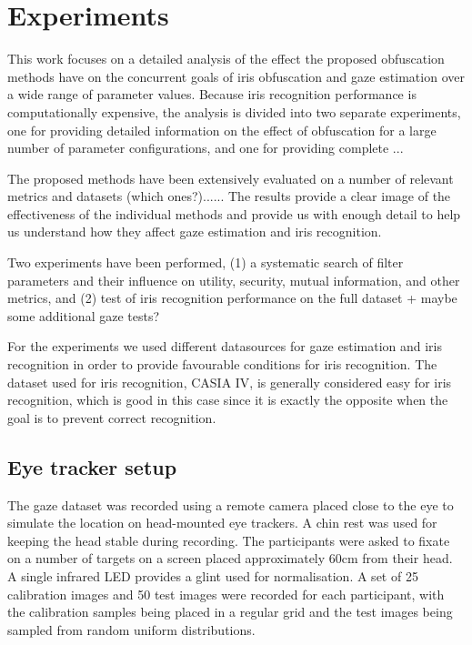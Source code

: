 \section{Experiments}
This work focuses on a detailed analysis of the effect the proposed obfuscation methods have on the concurrent goals of iris obfuscation and gaze estimation over a wide range of parameter values. Because iris recognition performance is computationally expensive, the analysis is divided into two separate experiments, one for providing detailed information on the effect of obfuscation for a large number of parameter configurations, and one for providing complete ...



The proposed methods have been extensively evaluated on a number of relevant metrics and datasets (which ones?)...... The results provide a clear image of the effectiveness of the individual methods and provide us with enough detail to help us understand how they affect gaze estimation and iris recognition.

Two experiments have been performed, (1) a systematic search of filter parameters and their influence on utility, security, mutual information, and other metrics, and (2) test of iris recognition performance on the full dataset + maybe some additional gaze tests?


For the experiments we used different datasources for gaze estimation and iris recognition in order to provide favourable conditions for iris recognition. The dataset used for iris recognition, CASIA IV, is generally considered easy for iris recognition, which is good in this case since it is exactly the opposite when the goal is to prevent correct recognition.


\subsection{Eye tracker setup}



The gaze dataset was recorded using a remote camera placed close to the eye to simulate the location on head-mounted eye trackers. A chin rest was used for keeping the head stable during recording. The participants were asked to fixate on a number of targets on a screen placed approximately 60cm from their head. A single infrared LED provides a glint used for normalisation. A set of 25 calibration images and 50 test images were recorded for each participant, with the calibration samples being placed in a regular grid and the test images being sampled from random uniform distributions.



